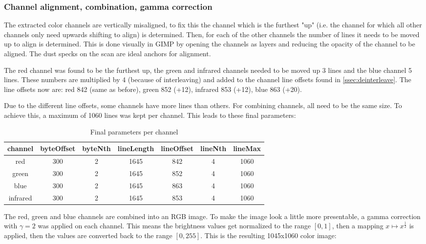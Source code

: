 \documentclass{article}
\begin{document}
\subsubsection{Channel alignment, combination, gamma correction}

The extracted color channels are vertically misaligned, to fix this the
channel which is the furthest "up" (i.e. the channel for which all other channels only need
upwards shifting to align) is determined. Then, for each of the other channels the number
of lines it needs to be moved up to align is determined. This is done visually in GIMP by
opening the channels as layers and reducing the opacity of the channel to be aligned.
The dust specks on the scan are ideal anchors for alignment.

The red channel was found to be the furthest up, the green and infrared channels
needed to be moved up 3 lines and the blue channel 5 lines.
These numbers are multiplied by 4
(because of interleaving) and added to the channel line offsets found in \autoref{ssec:deinterleave}.
The line offsets now are: red 842 (same as before), green 852 (+12), infrared 853 (+12), blue 863 (+20).

Due to the different line offsets, some channels have more lines than others.
For combining channels, all need to be the same size. To achieve this, a maximum
of 1060 lines was kept per channel. This leads to these final parameters:

\begin{table}[H]
  \caption{Final parameters per channel}
  \centering
  \begin{tabular}{c | c | c | c | c | c | c}
    channel & byteOffset & byteNth & lineLength & lineOffset & lineNth & lineMax \\ \hline
    red & 300 & 2 & 1645 & 842 & 4 & 1060 \\
    green & 300 & 2 & 1645 & 852 & 4 & 1060 \\
    blue & 300 & 2 & 1645 & 863 & 4 & 1060 \\
    infrared & 300 & 2 & 1645 & 853 & 4 & 1060 \\
  \end{tabular}
\end{table}

The red, green and blue channels are combined into an RGB image. To make the image look a little
more presentable, a gamma correction with $\gamma = 2$ was applied on each channel.
This means the brightness values get normalized to the range $[0, 1]$,
then a mapping $x \mapsto x^{\frac{1}{2}}$ is applied, then the values are
converted back to the range $[0, 255]$. This is the resulting 1045x1060 color image:
\end{document}

